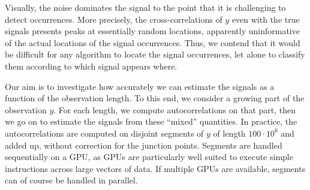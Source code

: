 \documentclass[12pt]{article}
\newcommand{\1}{\mathbf{1}}
\theoremstyle{plain}
\theoremstyle{definition}
\theoremstyle{remark}
\theoremstyle{plain}
\theoremstyle{remark}
\theoremstyle{plain}
\theoremstyle{plain}
\theoremstyle{plain}
\numberwithin{equation}{section}
\begin{document}
Visually, the noise dominates the signal to the point that it is challenging to detect occurrences. More precisely, the cross-correlations of $y$ even with the true signals presents peaks at essentially random locations, apparently uninformative of the actual locations of the signal occurrences. Thus, we contend that it would be difficult for any algorithm to locate the signal occurrences, let alone to classify them according to which signal appears where.


Our aim is to investigate how accurately we can estimate the signals as a function of the observation length. To this end, we consider a growing part of the observation $y$. For each length, we compute autocorrelations on that part, then we go on to estimate the signals from these ``mixed'' quantities. In practice, the autocorrelations are computed on disjoint segments of $y$ of length $100\cdot10^6$ and added up, without correction for the junction points. Segments are handled sequentially on a GPU, as GPUs are particularly well suited to execute simple instructions across large vectors of data. If multiple GPUs are available, segments can of course be handled in parallel.
\end{document}
